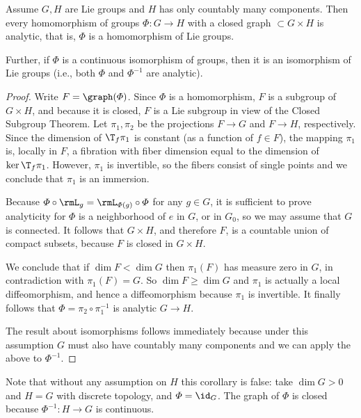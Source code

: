 \begin{cor}[{{\cite[Prop.~1.10.8]{DK}}}]
    Assume $G,H$ are Lie groups and $H$ has only countably many components. Then every homomorphism of groups $\varPhi:G\to H$ with a closed graph $\subset G\times H$ is analytic, that is, $\varPhi$ is a homomorphism of Lie groups.

    Further, if $\varPhi$ is a continuous isomorphism of groups, then it is an isomorphism of Lie groups (i.e., both $\varPhi$ and $\varPhi^{-1}$ are analytic).
\end{cor}
\begin{proof}
    Write $F=\graph(\varPhi)$. Since $\varPhi$ is a homomorphism, $F$ is a subgroup of $G\times H$, and because it is closed, $F$ is a Lie subgroup in view of the Closed Subgroup Theorem. Let $\pi_1,\pi_2$ be the projections $F\to G$ and $F\to H$, respectively. Since the dimension of $\T_f\pi_1$ is constant (as a function of $f\in F$), the mapping $\pi_1$ is, locally in $F$, a fibration with fiber dimension equal to the dimension of $\ker \T_f\pi_1$. However, $\pi_1$ is invertible, so the fibers consist of single points and we conclude that $\pi_1$ is an immersion.

    Because $\varPhi\circ \rmL_g=\rmL_{\varPhi(g)}\circ\varPhi$ for any $g\in G$, it is sufficient to prove analyticity for $\varPhi$ is a neighborhood of $e$ in $G$, or in $G_0$, so we may assume that $G$ is connected. It follows that $G\times H$, and therefore $F$, is a countable union of compact subsets, because $F$ is closed in $G\times H$.

    We conclude that if $\dim F<\dim G$ then $\pi_1(F)$ has measure zero in $G$, in contradiction with $\pi_1(F)=G$. So $\dim F\geq \dim G$ and $\pi_1$ is actually a local diffeomorphism, and hence a diffeomorphism because $\pi_1$ is invertible. It finally follows that $\varPhi=\pi_2\circ\pi_1^{-1}$ is analytic $G\to H$.

    The result about isomorphisms follows immediately because under this assumption $G$ must also have countably many components and we can apply the above to $\varPhi^{-1}$.
\end{proof}

\begin{rem}
    Note that without any assumption on $H $ this corollary is false: take $\dim G>0$ and $H=G$ with discrete topology, and $\varPhi=\id_G$. The graph of $\varPhi$ is closed because $\varPhi^{-1}:H\to G$ is continuous.
\end{rem}


